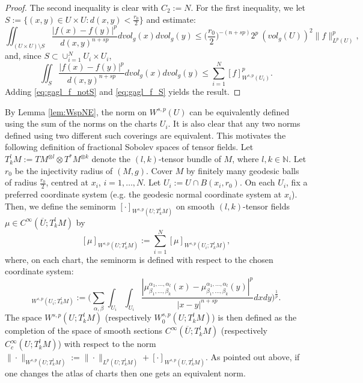 \documentclass[12pt]{article}
\theoremstyle{plain}
\numberwithin{equation}{section}
\begin{document}
    \begin{proof}
        The second inequality is clear with $C_2 :=N$. For the first inequality, we let $S := \{(x,y)  \in U \times U : d(x,y) < \frac{r_0}{2}\}$ and estimate:
        \begin{equation} \label{eq:gagl_f_notS}
            \iint_{(U\times U)\setminus S} \frac{|f(x)-f(y)|^p}{d(x,y)^{n+sp}} dvol_g(x) dvol_g(y) \leq \Big(\frac{r_0}2\Big)^{-(n+sp)} 2^{p}~ (vol_g(U))^2 \|f\|_{L^p(U)}^p,
        \end{equation}
        and, since $S \subset \cup_{i=1}^N U_i \times U_i$,
        \begin{equation} \label{eq:gagl_f_S}
            \iint_{S} \frac{|f(x)-f(y)|^p}{d(x,y)^{n+sp}} dvol_g(x) dvol_g(y) \leq \sum_{i=1}^N [f]_{W^{s,p}(U_i)}^p.
        \end{equation}
        Adding \eqref{eq:gagl_f_notS} and \eqref{eq:gagl_f_S} yields the result.
    \end{proof}
    By Lemma \ref{lem:WspNE}, the norm on $W^{s,p}(U)$ can be equivalently defined using the sum of the norms on the charts $U_i$. It is also clear that any two norms defined using two different such coverings are equivalent. This motivates the following definition of fractional Sobolev spaces of tensor fields. Let $T^l_k M := TM^{\otimes l} \otimes T^*M^{\otimes k}$ denote the $(l,k)$-tensor bundle of $M$, where $l,k \in \mathbb{N}$. Let $r_0$ be the injectivity radius of $(M,g)$. Cover $M$ by finitely many geodesic balls of radius $\frac{r_0}2$, centred at $x_i$, $i=1,\dots,N$. Let $U_i := U \cap B(x_i,{r_0})$. On each $U_i$, fix a preferred coordinate system (e.g. the geodesic normal coordinate system at $x_i$). Then, we define the seminorm $[\cdot]_{W^{s,p}(U;T^l_k M)}$ on smooth $(l,k)$-tensor fields $\mu \in C^\infty(\overline U; T^l_k M)$ by
    \begin{equation} \label{eq:gag_sum_over_charts}
        [\mu]_{W^{s,p}(U;T^l_k M)} := \sum_{i=1}^N [\mu]_{W^{s,p}(U_i;T^l_k M)},
    \end{equation}
    where, on each chart, the seminorm is defined with respect to the chosen coordinate system: 
    \begin{equation*}
        [\mu]_{W^{s,p}(U_i; T^l_k M)} := \Big( \sum_{\alpha, \beta}\int_{U_i} \int_{U_i} \frac{|\mu^{\alpha_1, \dots, \alpha_l}_{\beta_1, \dots, \beta_k}(x) - \mu^{\alpha_1, \dots, \alpha_l}_{\beta_1, \dots, \beta_k}(y)|^p}{|x-y|^{n+sp}} dxdy\Big)^{\frac1p}.
    \end{equation*}
    The space $W^{s,p}(U;T^l_k M)$ (respectively $W^{s,p}_0(U;T^l_k M)$) is then defined as the completion of the space of smooth sections $C^\infty(\overline U;T^l_k M)$ (respectively $C^\infty_c(U;T^l_k M)$) with respect to the norm $\|\cdot \|_{W^{s,p}(U;T^l_k M)} := \|\cdot \|_{L^p(U;T^l_k M)} + [\cdot]_{W^{s,p}(U,T^l_k M)}$. As pointed out above, if one changes the atlas of charts then one gets an equivalent norm.
\end{document}
